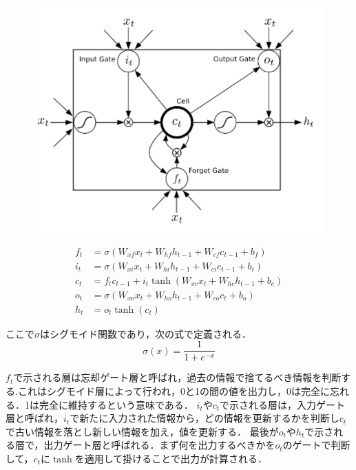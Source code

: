 \begin{figure}[h]
\centering
\includegraphics[width=0.7\linewidth]{fig/lstm.png}
\caption{}
\label{fig:LSTM}
\end{figure}

\begin{align}\label{eq:LSTM}
  f_t & = \sigma(W_{xf} x_t + W_{hf} h_{t-1} + W_{cf} c_{t-1} + b_f ) \\
  i_t & = \sigma(W_{xi} x_t + W_{hi} h_{t-1} + W_{ci} c_{t-1} + b_i) \\
  c_t & = f_t c_{t-1} + i_t \tanh(W_{xc} x_t + W_{hc} h_{t-1} + b_c) \\
  o_t & = \sigma(W_{xo} x_t + W_{ho} h_{t-1} + W_{co} c_t + b_o) \\
  h_t & = o_t \tanh(c_t) 
\end{align}

ここで$\sigma$はシグモイド関数であり，次の式で定義される．
\begin{equation}\label{eq:sigmoid}
  \sigma (x) = \dfrac{1}{1 + e^{-x}}
\end{equation}

$f_t$で示される層は忘却ゲート層と呼ばれ，過去の情報で捨てるべき情報を判断する.これはシグモイド層によって行われ，0と1の間の値を出力し，0は完全に忘れる．1は完全に維持するという意味である．
$i_t$や$c_t$で示される層は，入力ゲート層と呼ばれ，$i_t$で新たに入力された情報から，どの情報を更新するかを判断し$c_t$で古い情報を落とし新しい情報を加え，値を更新する．
最後が$o_t$や$h_t$で示される層で，出力ゲート層と呼ばれる．まず何を出力するべきかを$o_t$のゲートで判断して，$c_t$に$\tanh$を適用して掛けることで出力が計算される．


